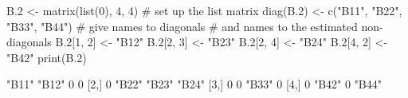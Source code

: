 \begin{Schunk}
\begin{Sinput}
 B.2 <- matrix(list(0), 4, 4) # set up the list matrix
 diag(B.2) <- c("B11", "B22", "B33", "B44") # give names to diagonals
 # and names to the estimated non-diagonals
 B.2[1, 2] <- "B12"
 B.2[2, 3] <- "B23"
 B.2[2, 4] <- "B24"
 B.2[4, 2] <- "B42"
 print(B.2)
\end{Sinput}
\begin{Soutput}
     [,1]  [,2]  [,3]  [,4] 
[1,] "B11" "B12" 0     0    
[2,] 0     "B22" "B23" "B24"
[3,] 0     0     "B33" 0    
[4,] 0     "B42" 0     "B44"
\end{Soutput}
\end{Schunk}

